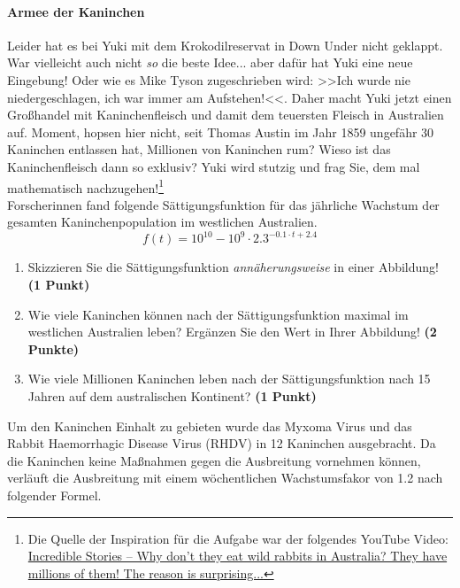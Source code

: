 \documentclass[a4paper, 9pt]{scrartcl}\usepackage[]{graphicx}\usepackage[]{xcolor}
\begin{document}
\paragraph{Armee der Kaninchen}



Leider hat es bei Yuki mit dem Krokodilreservat in Down Under nicht geklappt. War vielleicht auch nicht \textit{so} die beste Idee... aber dafür hat Yuki eine neue Eingebung! Oder wie es Mike Tyson zugeschrieben wird: >>Ich wurde nie niedergeschlagen, ich war immer am Aufstehen!<<. Daher macht Yuki jetzt einen Großhandel mit Kaninchenfleisch und damit dem teuersten Fleisch in Australien auf. Moment, hopsen hier nicht, seit Thomas Austin im Jahr 1859 ungefähr 30 Kaninchen entlassen hat, Millionen von Kaninchen rum? Wieso ist das Kaninchenfleisch dann so exklusiv? Yuki wird stutzig und frag Sie, dem mal mathematisch nachzugehen!\footnote{Die Quelle der Inspiration für die Aufgabe war der folgendes YouTube Video: \href{https://youtu.be/38fuOr3tdgc?si=Li7NL_FoByML8JtT}{ Incredible Stories -- Why don't they eat wild rabbits in Australia? They have    millions of them! The reason is surprising...}} \\

Forscherinnen fand folgende Sättigungsfunktion für das jährliche Wachstum der gesamten Kaninchenpopulation im westlichen Australien.
\begin{equation*}
  f(t) = \ensuremath{10^{10}} - \ensuremath{10^{9}} \cdot 2.3^{-0.1 \cdot t + 2.4}
\end{equation*}

\begin{enumerate}
\item Skizzieren Sie die Sättigungsfunktion \textit{annäherungsweise} in einer Abbildung! \textbf{(1 Punkt)}
\item Wie viele Kaninchen können nach der Sättigungsfunktion maximal im westlichen Australien leben? Ergänzen Sie den Wert in Ihrer Abbildung! \textbf{(2 Punkte)}
\item Wie viele Millionen Kaninchen leben nach der Sättigungsfunktion nach 15 Jahren auf dem australischen Kontinent? \textbf{(1 Punkt)}
\end{enumerate}

Um den Kaninchen Einhalt zu gebieten wurde das Myxoma Virus und das Rabbit Haemorrhagic Disease Virus (RHDV) in 12 Kaninchen ausgebracht. Da die Kaninchen keine Maßnahmen gegen die Ausbreitung vornehmen können, verläuft die Ausbreitung mit einem wöchentlichen Wachstumsfakor von 1.2 nach folgender Formel.
\end{document}
